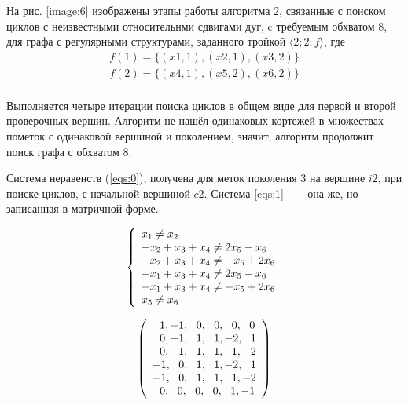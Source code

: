 \documentclass[14pt]{mmcs-article}
\begin{document}
На рис. \ref{image:6} изображены этапы работы алгоритма 2, связанные с поиском циклов с неизвестными относительнми сдвигами дуг, c требуемым обхватом 8, для графа с регулярными структурами, заданного тройкой $ \langle 2; 2; f\rangle $, где 
$$
  \begin{array}{ll}
    f(1) = \{ (x1, 1), (x2, 1), (x3, 2) \}\\
    f(2) = \{ (x4, 1), (x5, 2), (x6, 2) \}\\
  \end{array}
$$

Выполняется четыре итерации поиска циклов в общем виде для первой и второй проверочных вершин. Алгоритм не нашёл одинаковых кортежей в множествах пометок с одинаковой вершиной и поколением, значит, алгоритм продолжит поиск графа с обхватом 8.

Система неравенств (\ref{eqs:0}), получена для меток поколения $3$ на вершине $i2$, при поиске циклов, с начальной вершиной $c2$. Система \ref{eqs:1} ~--- она же, но записанная в матричной форме.

\begin{equation}
    \centering
    \left\{
        \begin{array}{ll}
            x_1 \neq x_2\\
            -x_2 + x_3 + x_4 \neq 2 x_5 - x_6\\
            -x_2 + x_3 + x_4 \neq -x_5 + 2 x_6\\
            -x_1 + x_3 + x_4 \neq 2 x_5 - x_6\\
            -x_1 + x_3 + x_4 \neq -x_5 + 2 x_6\\
            x_5 \neq x_6\\
        \end{array}
    \right.
    \label{eqs:0}
\end{equation}

\begin{equation}
    \centering
    \left(
        \begin{array}{ll}
            \ \ 1,-1,\ \ 0,\ \ 0,\ \ 0,\ \ 0\\
            \ \ 0,-1,\ \ 1,\ \ 1,-2,\ \ 1\\
            \ \ 0,-1,\ \ 1,\ \ 1,\ \ 1,-2\\
            -1,\ \ 0,\ \ 1,\ \ 1,-2,\ \ 1\\
            -1,\ \ 0,\ \ 1,\ \ 1,\ \ 1,-2\\
            \ \ 0,\ \ 0,\ \ 0,\ \ 0,\ \ 1,-1\\
        \end{array}
    \right)
    \label{eqs:1}
\end{equation}
\end{document}
